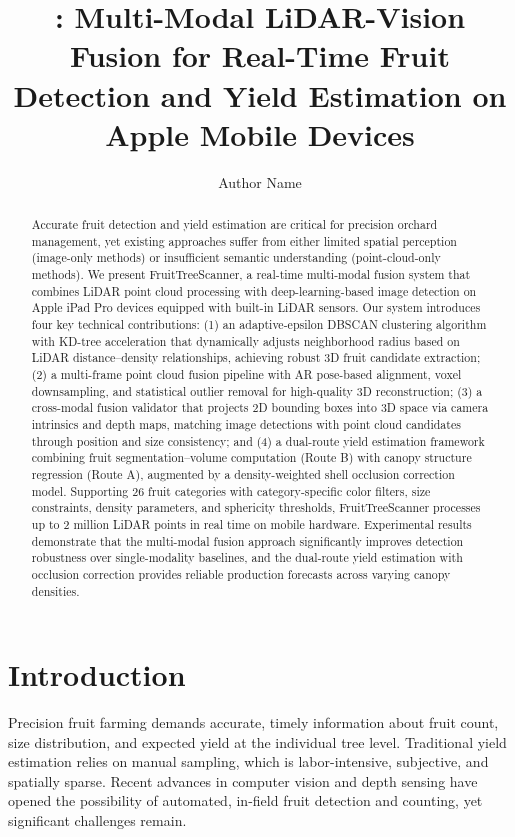 \documentclass[article,final]{iclr2024_conference}
\title{\theMethod: Multi-Modal LiDAR-Vision Fusion for Real-Time Fruit Detection and Yield Estimation on Apple Mobile Devices}
\author[1]{Author Name}
\affil[1]{Affiliation}
\newcommand{\theMethod}{FruitTreeScanner}
\begin{document}
\maketitle

\begin{abstract}
Accurate fruit detection and yield estimation are critical for precision orchard management, yet existing approaches suffer from either limited spatial perception (image-only methods) or insufficient semantic understanding (point-cloud-only methods). We present \theMethod{}, a real-time multi-modal fusion system that combines LiDAR point cloud processing with deep-learning-based image detection on Apple iPad Pro devices equipped with built-in LiDAR sensors. Our system introduces four key technical contributions: (1) an adaptive-epsilon DBSCAN clustering algorithm with KD-tree acceleration that dynamically adjusts neighborhood radius based on LiDAR distance--density relationships, achieving robust 3D fruit candidate extraction; (2) a multi-frame point cloud fusion pipeline with AR pose-based alignment, voxel downsampling, and statistical outlier removal for high-quality 3D reconstruction; (3) a cross-modal fusion validator that projects 2D bounding boxes into 3D space via camera intrinsics and depth maps, matching image detections with point cloud candidates through position and size consistency; and (4) a dual-route yield estimation framework combining fruit segmentation--volume computation (Route B) with canopy structure regression (Route A), augmented by a density-weighted shell occlusion correction model. Supporting 26 fruit categories with category-specific color filters, size constraints, density parameters, and sphericity thresholds, \theMethod{} processes up to 2 million LiDAR points in real time on mobile hardware. Experimental results demonstrate that the multi-modal fusion approach significantly improves detection robustness over single-modality baselines, and the dual-route yield estimation with occlusion correction provides reliable production forecasts across varying canopy densities.
\end{abstract}

\section{Introduction}
\label{sec:intro}

Precision fruit farming demands accurate, timely information about fruit count, size distribution, and expected yield at the individual tree level. Traditional yield estimation relies on manual sampling, which is labor-intensive, subjective, and spatially sparse. Recent advances in computer vision and depth sensing have opened the possibility of automated, in-field fruit detection and counting, yet significant challenges remain.
\end{document}
